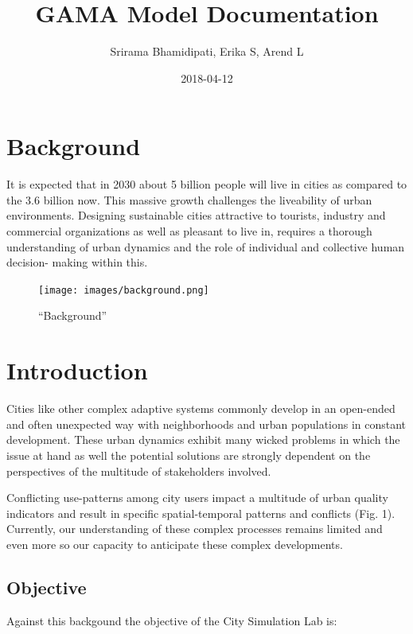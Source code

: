 \documentclass[]{book}
\title{GAMA Model Documentation}
\author{Srirama Bhamidipati, Erika S, Arend L}
\date{2018-04-12}
\theoremstyle{definition}
\theoremstyle{definition}
\theoremstyle{definition}
\theoremstyle{remark}
\begin{document}
\maketitle

{
\setcounter{tocdepth}{1}
\tableofcontents
}
\hypertarget{background}{%
\chapter*{Background}\label{background}}

It is expected that in 2030 about 5 billion people will live in cities
as compared to the 3.6 billion now. This massive growth challenges the
liveability of urban environments. Designing sustainable cities
attractive to tourists, industry and commercial organizations as well as
pleasant to live in, requires a thorough understanding of urban dynamics
and the role of individual and collective human decision- making within
this.

\begin{figure}
\centering
\texttt{[image: images/background.png]}
\caption{``Background''}
\end{figure}

\hypertarget{introduction}{%
\chapter{Introduction}\label{introduction}}

Cities like other complex adaptive systems commonly develop in an
open-ended and often unexpected way with neighborhoods and urban
populations in constant development. These urban dynamics exhibit many
wicked problems in which the issue at hand as well the potential
solutions are strongly dependent on the perspectives of the multitude of
stakeholders involved.

Conflicting use-patterns among city users impact a multitude of urban
quality indicators and result in specific spatial-temporal patterns and
conflicts (Fig. 1). Currently, our understanding of these complex
processes remains limited and even more so our capacity to anticipate
these complex developments.

\hypertarget{objective}{%
\section{Objective}\label{objective}}

Against this backgound the objective of the City Simulation Lab is:
\end{document}
